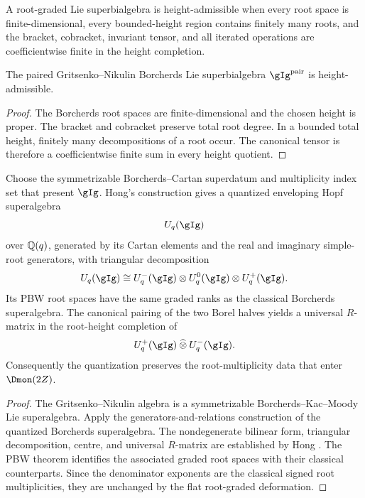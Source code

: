 \begin{definition}
A root-graded Lie superbialgebra is height-admissible when every root space is finite-dimensional, every bounded-height region contains finitely many roots, and the bracket, cobracket, invariant tensor, and all iterated operations are coefficientwise finite in the height completion.
\end{definition}

\begin{proposition}
The paired Gritsenko--Nikulin Borcherds Lie superbialgebra $\gIg^{\mathrm{pair}}$ is height-admissible.
\end{proposition}
\begin{proof}
The Borcherds root spaces are finite-dimensional and the chosen height is proper.  The bracket and cobracket preserve total root degree.  In a bounded total height, finitely many decompositions of a root occur.  The canonical tensor is therefore a coefficientwise finite sum in every height quotient.
\end{proof}

\begin{theorem}
Choose the symmetrizable Borcherds--Cartan superdatum and multiplicity index set that present $\gIg$.  Hong's construction gives a quantized enveloping Hopf superalgebra
\[
 U_q(\gIg)
\]
over $\mathbb Q(q)$, generated by its Cartan elements and the real and imaginary simple-root generators, with triangular decomposition
\[
 U_q(\gIg)\cong U_q^-(\gIg)\tensor U_q^0(\gIg)\tensor U_q^+(\gIg).
\]
Its PBW root spaces have the same graded ranks as the classical Borcherds superalgebra.  The canonical pairing of the two Borel halves yields a universal $R$-matrix in the root-height completion of
\[
 U_q^+(\gIg)\widehattensor U_q^-(\gIg).
\]
Consequently the quantization preserves the root-multiplicity data that enter $\Dmon(2Z)$.
\end{theorem}
\begin{proof}
The Gritsenko--Nikulin algebra is a symmetrizable Borcherds--Kac--Moody Lie superalgebra.  Apply the generators-and-relations construction of the quantized Borcherds superalgebra.  The nondegenerate bilinear form, triangular decomposition, centre, and universal $R$-matrix are established by Hong \cite{Hong98}.  The PBW theorem identifies the associated graded root spaces with their classical counterparts.  Since the denominator exponents are the classical signed root multiplicities, they are unchanged by the flat root-graded deformation.
\end{proof}

